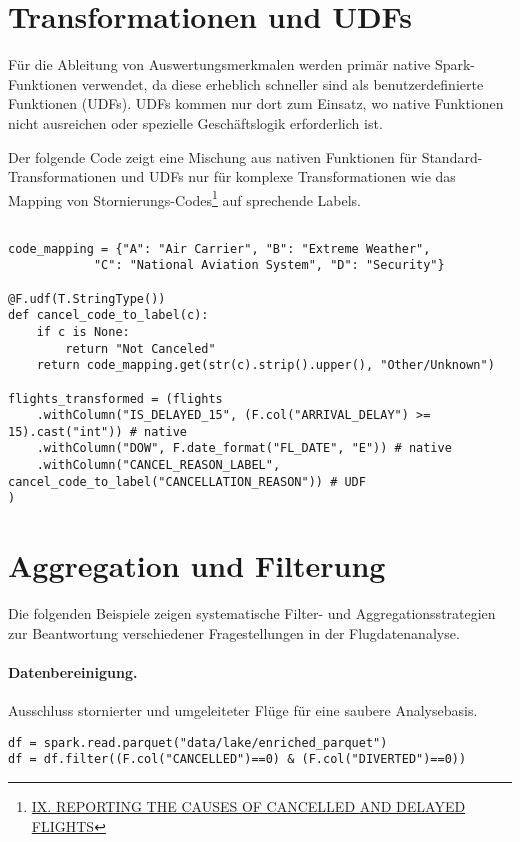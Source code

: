 \documentclass[a4paper,11pt]{article}
\begin{document}
\section{Transformationen und UDFs}

Für die Ableitung von Auswertungsmerkmalen werden primär native Spark-Funktionen verwendet, da diese erheblich schneller sind als benutzerdefinierte Funktionen (UDFs). UDFs kommen nur dort zum Einsatz, wo native Funktionen nicht ausreichen oder spezielle Geschäftslogik erforderlich ist.

Der folgende Code zeigt eine Mischung aus nativen Funktionen für Standard-Transformationen und UDFs nur für komplexe Transformationen wie das Mapping von Stornierungs-Codes\footnote{\href{https://www.bts.gov/topics/airlines-and-airports/number-14-time-reporting}{IX. REPORTING THE CAUSES OF CANCELLED AND DELAYED FLIGHTS}} auf sprechende Labels.

\begin{verbatim}

code_mapping = {"A": "Air Carrier", "B": "Extreme Weather", 
            "C": "National Aviation System", "D": "Security"}
            
@F.udf(T.StringType())
def cancel_code_to_label(c):
    if c is None:
        return "Not Canceled"
    return code_mapping.get(str(c).strip().upper(), "Other/Unknown")
    
flights_transformed = (flights
    .withColumn("IS_DELAYED_15", (F.col("ARRIVAL_DELAY") >= 15).cast("int")) # native
    .withColumn("DOW", F.date_format("FL_DATE", "E")) # native
    .withColumn("CANCEL_REASON_LABEL", cancel_code_to_label("CANCELLATION_REASON")) # UDF
)
\end{verbatim}

\section{Aggregation und Filterung}

Die folgenden Beispiele zeigen systematische Filter- und Aggregationsstrategien zur Beantwortung verschiedener Fragestellungen in der Flugdatenanalyse.

\paragraph{Datenbereinigung.} Ausschluss stornierter und umgeleiteter Flüge für eine saubere Analysebasis.

\begin{verbatim}
df = spark.read.parquet("data/lake/enriched_parquet")
df = df.filter((F.col("CANCELLED")==0) & (F.col("DIVERTED")==0))
\end{verbatim}
\end{document}

